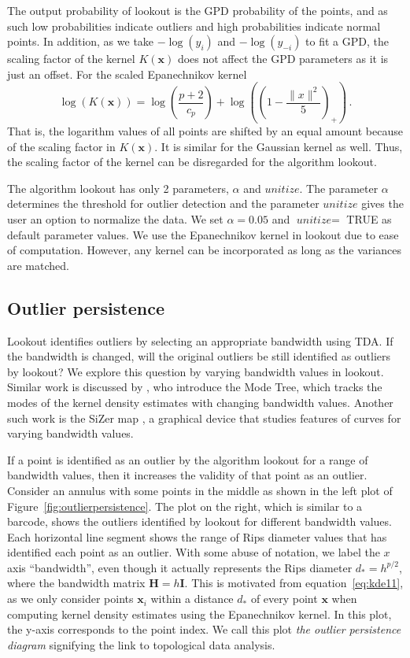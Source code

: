 \documentclass[letter,12pt]{article}
\begin{document}
The output probability of lookout is the GPD probability of the points, and as such low probabilities indicate outliers and high probabilities indicate normal points.  In addition, as we take $-\log(y_i)$ and $-\log(y_{-i})$ to fit a GPD, the scaling factor of the kernel $K(\bm{x})$ does not affect the GPD parameters as it is just an offset. For the scaled Epanechnikov kernel
\begin{equation}\label{eq:lookout1}
    \log(K(\bm{x}))  = \log\left( \frac{p+2}{c_p}\right) + \log\left( \left(1 -\frac{\| x \|^2}{5} \right)_+\right)\, . 
\end{equation}
That is, the logarithm values of all points are shifted by an equal amount because of the scaling factor in $K(\bm{x})$. It is similar for the Gaussian kernel as well.  Thus, the scaling factor of the kernel can be disregarded for the algorithm lookout. 

The algorithm lookout has only 2 parameters, $\alpha$ and $\textit{unitize}$. The parameter $\alpha$ determines the threshold for outlier detection and the parameter $\textit{unitize}$ gives the user an option to normalize the data. We set  $\alpha= 0.05$ and $\textit{unitize} =$ TRUE as default parameter values. We use the Epanechnikov kernel in lookout due to ease of computation. However, any kernel can be  incorporated as long as the variances are matched. 

\subsection{Outlier persistence}\label{subsec:persistence}
Lookout identifies outliers by selecting an appropriate bandwidth using TDA. If the bandwidth is changed, will the original outliers be still identified as outliers by lookout?  We explore this question by varying bandwidth values in lookout. Similar work is discussed by \cite{Minnotte1993}, who introduce the Mode Tree, which tracks the modes of the kernel density estimates with changing bandwidth values. Another such work is the  SiZer map \citep{Chaudhuri1999}, a graphical device that studies features of curves for varying bandwidth values. 

If a point is identified as an outlier by the algorithm lookout for a range of bandwidth values, then it increases the validity of that point as an outlier. Consider an annulus with some points in the middle as shown in the left plot of Figure~\ref{fig:outlierpersistence}. The plot on the right, which is similar to a barcode,  shows the outliers identified by lookout for different bandwidth values. Each horizontal line segment shows the range of Rips diameter values that has identified each point as an outlier. With some abuse of notation, we label the $x$ axis ``bandwidth'', even though  it actually represents the Rips diameter $d_* = h^{p/2}$, where the bandwidth matrix $\bm{H} = h\bm{I}$. This is motivated from equation~\eqref{eq:kde11}, as we only consider points $\bm{x}_i$ within a distance $d_*$ of every point $\bm{x}$  when computing kernel density estimates using the Epanechnikov kernel. In this plot, the y-axis corresponds to the point index. We call this plot \textit{the outlier persistence diagram} signifying the link to topological data analysis. 
\end{document}
